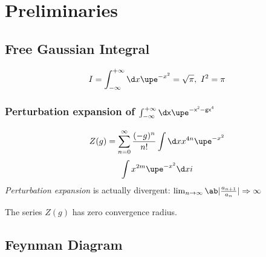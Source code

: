 
\chapter{Preliminaries}

\section{Free Gaussian Integral}

\[I = \int_{-\infty}^{+\infty} \d x \upe^{-x^2} = \sqrt\pi, ~ I^2 = \pi\]

\subsection{Perturbation expansion of $\mathsf{\int_{-\infty}^{+\infty} \d x \upe^{-x^2-gx^4}}$}

\begin{equation}
  Z(g) = \sum_{n = 0}^\infty \frac{(-g)^n}{n!} \int \d x x^{4n} \upe^{-x^2}
  \label{1.1}
\end{equation}
\begin{equation}
  \int x^{2m}\upe^{-x^2}\d x i
\end{equation}
\emph{Perturbation expansion} is actually divergent: $\lim_{n \to \infty} \ab|\frac{a_{n+1}}{a_n}| \Rightarrow \infty$

The series $Z(g)$ has zero convergence radius.

\section{Feynman Diagram}

